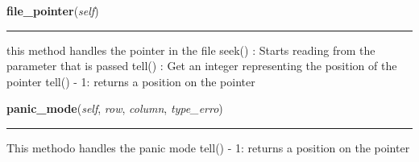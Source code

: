    \label{compiladores:lexer:Lexer:file_pointer}

    \vspace{0.5ex}

\hspace{.8\funcindent}\begin{boxedminipage}{\funcwidth}

    \raggedright \textbf{file\_pointer}(\textit{self})

    \vspace{-1.5ex}

    \rule{\textwidth}{0.5\fboxrule}
\setlength{\parskip}{2ex}
    this method handles the pointer in the file seek() : Starts reading 
    from the parameter that is passed tell() : Get an integer representing 
    the position of the pointer tell() - 1: returns a position on the 
    pointer

\setlength{\parskip}{1ex}
    \end{boxedminipage}

    \label{compiladores:lexer:Lexer:panic_mode}

    \vspace{0.5ex}

\hspace{.8\funcindent}\begin{boxedminipage}{\funcwidth}

    \raggedright \textbf{panic\_mode}(\textit{self}, \textit{row}, \textit{column}, \textit{type\_erro})

    \vspace{-1.5ex}

    \rule{\textwidth}{0.5\fboxrule}
\setlength{\parskip}{2ex}
    This methodo handles the panic mode tell() - 1: returns a position on 
    the pointer

\setlength{\parskip}{1ex}
    \end{boxedminipage}

    \label{compiladores:lexer:Lexer:get_erros}

    \vspace{0.5ex}

